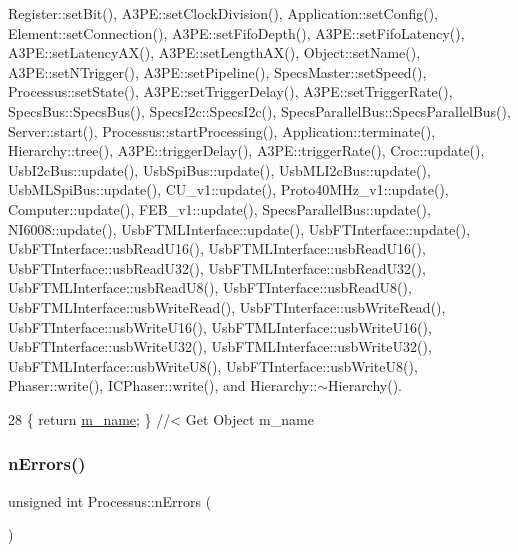 Register\+::set\+Bit(), A3\+P\+E\+::set\+Clock\+Division(), Application\+::set\+Config(), Element\+::set\+Connection(), A3\+P\+E\+::set\+Fifo\+Depth(), A3\+P\+E\+::set\+Fifo\+Latency(), A3\+P\+E\+::set\+Latency\+A\+X(), A3\+P\+E\+::set\+Length\+A\+X(), Object\+::set\+Name(), A3\+P\+E\+::set\+N\+Trigger(), A3\+P\+E\+::set\+Pipeline(), Specs\+Master\+::set\+Speed(), Processus\+::set\+State(), A3\+P\+E\+::set\+Trigger\+Delay(), A3\+P\+E\+::set\+Trigger\+Rate(), Specs\+Bus\+::\+Specs\+Bus(), Specs\+I2c\+::\+Specs\+I2c(), Specs\+Parallel\+Bus\+::\+Specs\+Parallel\+Bus(), Server\+::start(), Processus\+::start\+Processing(), Application\+::terminate(), Hierarchy\+::tree(), A3\+P\+E\+::trigger\+Delay(), A3\+P\+E\+::trigger\+Rate(), Croc\+::update(), Usb\+I2c\+Bus\+::update(), Usb\+Spi\+Bus\+::update(), Usb\+M\+L\+I2c\+Bus\+::update(), Usb\+M\+L\+Spi\+Bus\+::update(), C\+U\+\_\+v1\+::update(), Proto40\+M\+Hz\+\_\+v1\+::update(), Computer\+::update(), F\+E\+B\+\_\+v1\+::update(), Specs\+Parallel\+Bus\+::update(), N\+I6008\+::update(), Usb\+F\+T\+M\+L\+Interface\+::update(), Usb\+F\+T\+Interface\+::update(), Usb\+F\+T\+Interface\+::usb\+Read\+U16(), Usb\+F\+T\+M\+L\+Interface\+::usb\+Read\+U16(), Usb\+F\+T\+Interface\+::usb\+Read\+U32(), Usb\+F\+T\+M\+L\+Interface\+::usb\+Read\+U32(), Usb\+F\+T\+M\+L\+Interface\+::usb\+Read\+U8(), Usb\+F\+T\+Interface\+::usb\+Read\+U8(), Usb\+F\+T\+M\+L\+Interface\+::usb\+Write\+Read(), Usb\+F\+T\+Interface\+::usb\+Write\+Read(), Usb\+F\+T\+Interface\+::usb\+Write\+U16(), Usb\+F\+T\+M\+L\+Interface\+::usb\+Write\+U16(), Usb\+F\+T\+Interface\+::usb\+Write\+U32(), Usb\+F\+T\+M\+L\+Interface\+::usb\+Write\+U32(), Usb\+F\+T\+M\+L\+Interface\+::usb\+Write\+U8(), Usb\+F\+T\+Interface\+::usb\+Write\+U8(), Phaser\+::write(), I\+C\+Phaser\+::write(), and Hierarchy\+::$\sim$\+Hierarchy().


\begin{DoxyCode}
28 \{ \textcolor{keywordflow}{return} \hyperlink{classObject_a8b83c95c705d2c3ba0d081fe1710f48d}{m\_name}; \} \textcolor{comment}{//< Get Object m\_name}
\end{DoxyCode}
\mbox{\label{classProcessus_a82a0487f82f07cc2c2dc2731f98149e7}} 
\subsubsection{\texorpdfstring{n\+Errors()}{nErrors()}}
{\footnotesize\ttfamily unsigned int Processus\+::n\+Errors (\begin{DoxyParamCaption}{ }\end{DoxyParamCaption})\hspace{0.3cm}{\ttfamily [inherited]}}

